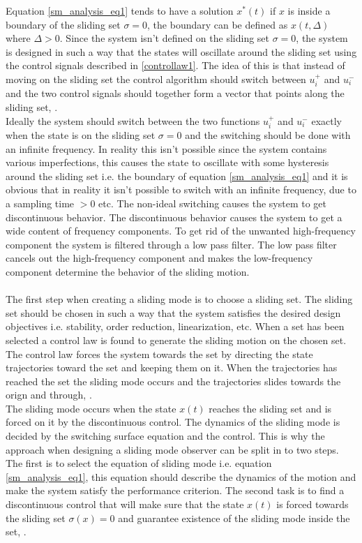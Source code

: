 \documentclass{LTHthesis}
\begin{document}
Equation \eqref{sm_analysis_eq1} tends to have a solution $x^*(t)$ if $x$ is inside a boundary of the sliding set $\sigma=0$, the boundary can be defined as $x(t,\Delta)$ where $\Delta >0$. Since the system isn't defined on the sliding set $\sigma=0$, the system is designed in such a way that the states will oscillate around the sliding set using the control signals described in \eqref{controllaw1}. The idea of this is that instead of moving on the sliding set the control algorithm should switch between $u_i^+$ and $u_i^-$ and the two control signals should together form a vector that points along the sliding set, \cite{chi2007}. \\ Ideally the system should switch between the two functions $u_i^+$ and $u_i^-$ exactly when the state is on the sliding set $\sigma=0$ and the switching should be done with an infinite frequency.  In reality this isn't possible since the system contains various imperfections, this causes the state to oscillate with some hysteresis around the sliding set i.e. the boundary of equation \eqref{sm_analysis_eq1} and it is obvious that in reality it isn't possible to switch with an infinite frequency, due to a sampling time $>0$ etc. The non-ideal switching causes the system to get discontinuous behavior. The discontinuous behavior causes the system to get a wide content of frequency components. To get rid of the unwanted high-frequency component the system is filtered through a low pass filter. The low pass filter cancels out the high-frequency component and makes the low-frequency component determine the behavior of the sliding motion. \\ \\
The first step when creating a sliding mode is to choose a sliding set. The sliding set should be chosen in such a way that the system satisfies the desired design objectives i.e. stability, order reduction, linearization, etc. When a set has been selected a control law is found to generate the sliding motion on the chosen set. The control law forces the system towards the set by directing the state trajectories toward the set and keeping them on it. When the trajectories has reached the set the sliding mode occurs and the trajectories slides towards the orign and through, \cite{Has1996}. \\
The sliding mode occurs when the state $x(t)$ reaches the sliding set and is forced on it by the discontinuous control. The dynamics of the sliding mode is decided by the switching surface equation and  the control. This is why the approach when designing a sliding mode observer can be split in to two steps. The first is to select the equation of sliding mode i.e. equation \eqref{sm_analysis_eq1}, this equation should describe the dynamics of the motion and make the system satisfy the performance criterion. The second task is to find a discontinuous control that will make sure that the state $x(t)$ is forced towards the sliding set $\sigma(x)=0$ and guarantee existence of the sliding mode inside the set, \cite{chi2007}.      
\end{document}
